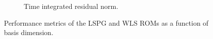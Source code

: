 \begin{figure}
\begin{center}
\begin{subfigure}[t]{0.49\textwidth}
\caption{Time integrated residual norm.}
\end{subfigure}
\caption{Performance metrics of the LSPG and WLS ROMs as a function of basis dimension.} 
\label{fig:rom_swe_pareto}
\end{center}
\end{figure}

